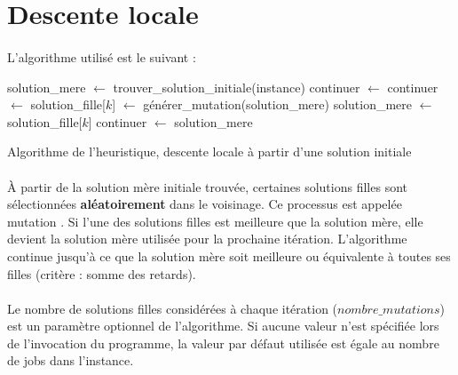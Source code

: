 \section{Descente locale}

\paragraph{}
L'algorithme utilisé est le suivant :

\begin{algorithm}[H] %
\begin{algorithmic}
\STATE solution\_mere $ \leftarrow $ trouver\_solution\_initiale(instance)
\STATE continuer $ \leftarrow $ \TRUE
{}
\STATE continuer $ \leftarrow $ \FALSE
\STATE {}
\STATE solution\_fille[$ k $] $ \leftarrow $ générer\_mutation(solution\_mere)
\STATE {}
\ENDFOR
\STATE {}
\STATE solution\_mere $ \leftarrow $ solution\_fille[$ k $]
\STATE continuer $ \leftarrow $ \TRUE { } 
\ENDIF
\ENDFOR
\ENDWHILE
\RETURN solution\_mere
\end{algorithmic}
\caption{\label{alg:heuristique}Algorithme de l'heuristique, descente locale à partir d'une solution initiale}
\end{algorithm}

\paragraph{}
À partir de la solution \og mère \fg{} initiale trouvée, certaines solutions \og filles \fg{} sont sélectionnées \textbf{aléatoirement} dans le voisinage.
Ce processus est appelée \og mutation \fg{}.
Si l'une des solutions filles est meilleure que la solution mère, elle devient la solution mère utilisée pour la prochaine itération.
L'algorithme continue jusqu'à ce que la solution mère soit meilleure ou équivalente à toutes ses filles (critère : somme des retards).

\paragraph{}
Le nombre de solutions filles considérées à chaque itération ($ nombre\_mutations $) est un paramètre optionnel de l'algorithme.
Si aucune valeur n'est spécifiée lors de l'invocation du programme, la valeur par défaut utilisée est égale au nombre de jobs dans l'instance.

